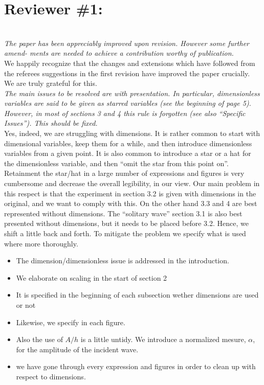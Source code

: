 \documentclass[11pt]{article}
\begin{document}
\newcommand{\refpoint}[1]{\ \vspace{0.3cm}\\ {\em #1}\  \vspace{0.3cm}\\ }
\newcommand{\refit}[1]{\em #1}
\newcommand{\refitem}[1]{\item {\em #1} }
\newcommand{\todo}[1]{\ \\ {\bf To do: #1}\\}
\section*{Reviewer \#1:} 
\refpoint{The paper has been appreciably improved upon revision. However some further amend-
ments are needed to achieve a contribution worthy of publication.}
We happily recognize that the changes and extensions which have followed from the referees suggestions 
in the first revision have improved the paper crucially. We are truly grateful for this. 
\refpoint{The main issues to be resolved are with presentation. In particular, dimensionless
variables are said to be given as starred variables (see the beginning of page 5). However,
in most of sections 3 and 4 this rule is forgotten (see also “Specific Issues”). This should
be fixed.}
Yes, indeed, we are struggling with dimensions. It is rather common to start with dimensional variables, keep
them for a while, and then introduce dimensionless variables from a given point. It is also common to 
introduce a star or a hat for the dimensionless variable, and then ``omit the star from this point on''. Retainment the star/hat in a large number of expressions and figures is very cumbersome and decrease
the overall legibility, in our view.
Our main problem in this respect is that the experiment in section 3.2 is given with dimensions in
the original, and we want to comply with this. On the other hand 3.3 and 4 are best represented
without dimensions. The ``solitary wave'' section 3.1 is also best presented without dimensions, 
but it needs to be placed before 3.2. Hence, we shift a little back and forth.
To mitigate the problem we specify what is used where more thoroughly.
\begin{itemize}
\item The dimension/dimensionless issue is addressed in the introduction.
\item We elaborate on scaling in the start of section 2
\item It is specified in the beginning of each subsection wether dimensions are used or not
\item Likewise, we specify in each figure.
\item Also the use of $A/h$ is a little untidy. We introduce a normalized mesure, $\alpha$, for
the amplitude of the incident wave.
\item we have gone through every expression and figures in order to clean up with respect to
dimensions.
\end{itemize}
    
\end{document}
